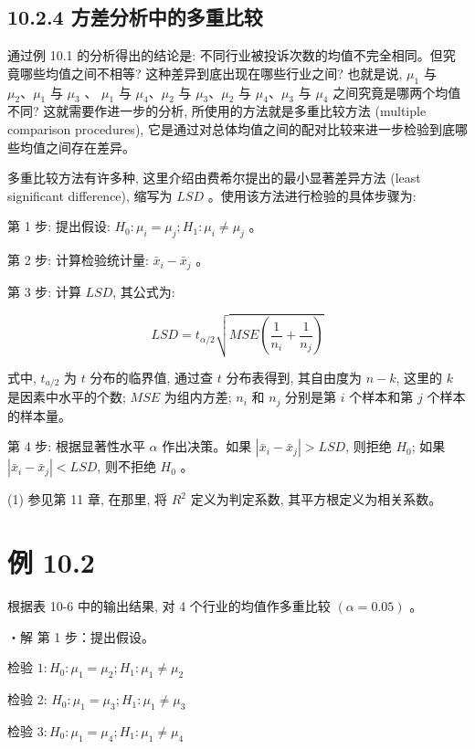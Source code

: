 \documentclass[10pt]{article}
\begin{document}
\begin{CJK*}{UTF8}{bsmi}
\subsection*{10.2.4 方差分析中的多重比较}
通过例 10.1 的分析得出的结论是: 不同行业被投诉次数的均值不完全相同。但究竟哪些均值之间不相等? 这种差异到底出现在哪些行业之间? 也就是说, $\mu_{1}$ 与 $\mu_{2} 、 \mu_{1}$ 与 $\mu_{3}$ 、 $\mu_{1}$ 与 $\mu_{4} 、 \mu_{2}$ 与 $\mu_{3} 、 \mu_{2}$ 与 $\mu_{4} 、 \mu_{3}$ 与 $\mu_{4}$ 之间究竟是哪两个均值不同? 这就需要作进一步的分析, 所使用的方法就是多重比较方法 (multiple comparison procedures), 它是通过对总体均值之间的配对比较来进一步检验到底哪些均值之间存在差异。

多重比较方法有许多种, 这里介绍由费希尔提出的最小显著差异方法 (least significant difference), 缩写为 $L S D$ 。使用该方法进行检验的具体步骤为:

第 1 步: 提出假设: $H_{0}: \mu_{i}=\mu_{j} ; H_{1}: \mu_{i} \neq \mu_{j}$ 。

第 2 步: 计算检验统计量: $\bar{x}_{i}-\bar{x}_{j}$ 。

第 3 步: 计算 $L S D$, 其公式为:


\begin{equation*}
L S D=t_{\alpha / 2} \sqrt{M S E\left(\frac{1}{n_{i}}+\frac{1}{n_{j}}\right)} \tag{10.11}
\end{equation*}


式中, $t_{a / 2}$ 为 $t$ 分布的临界值, 通过查 $t$ 分布表得到, 其自由度为 $n-k$, 这里的 $k$ 是因素中水平的个数; $M S E$ 为组内方差; $n_{i}$ 和 $n_{j}$ 分别是第 $i$ 个样本和第 $j$ 个样本的样本量。

第 4 步: 根据显著性水平 $\alpha$ 作出决策。如果 $\left|\bar{x}_{i}-\bar{x}_{j}\right|>L S D$, 则拒绝 $H_{0}$; 如果 $\left|\bar{x}_{i}-\bar{x}_{j}\right|<L S D$, 则不拒绝 $H_{0}$ 。

(1) 参见第 11 章, 在那里, 将 $R^{2}$ 定义为判定系数, 其平方根定义为相关系数。

\section*{例 10.2}
根据表 10-6 中的输出结果, 对 4 个行业的均值作多重比较 $(\alpha=0.05)$ 。

・解 第 1 步：提出假设。

检验 $1: H_{0}: \mu_{1}=\mu_{2} ; H_{1}: \mu_{1} \neq \mu_{2}$

检验 2: $H_{0}: \mu_{1}=\mu_{3} ; H_{1}: \mu_{1} \neq \mu_{3}$

检验 $3: H_{0}: \mu_{1}=\mu_{4} ; H_{1}: \mu_{1} \neq \mu_{4}$


\end{CJK*}
\end{document}
